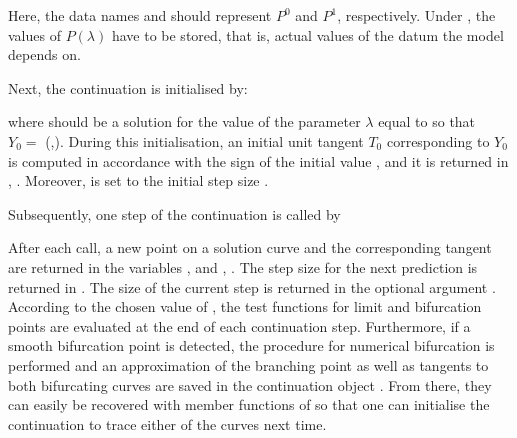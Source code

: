 \documentclass[a4paper,11pt,english]{sphinxmanual}
\begin{document}
Here, the data names  and  should represent
\(P^{0}\) and \(P^{1}\), respectively. Under , the
values of \(P(\lambda)\) have to be stored, that is, actual values of the
datum the model depends on.

Next, the continuation is initialised by:

\begin{sphinxVerbatim}[commandchars=\\\{\}]
    
\end{sphinxVerbatim}

where  should be a solution for the value of the parameter \(\lambda\)
equal to  so that \(Y_{0}=\) (,). During
this initialisation, an initial unit tangent \(T_{0}\) corresponding to
\(Y_{0}\) is computed in accordance with the sign of the initial value
, and it is returned in , . Moreover,  is
set to the initial step size .

Subsequently, one step of the continuation is called by

\begin{sphinxVerbatim}[commandchars=\\\{\}]
     
\end{sphinxVerbatim}

After each call, a new point on a solution curve and the corresponding tangent
are returned in the variables ,  and , . The
step size for the next prediction is returned in . The size of the
current step is returned in the optional argument . According to the
chosen value of , the test functions for limit and bifurcation
points are evaluated at the end of each continuation step. Furthermore, if a
smooth bifurcation point is detected, the procedure for numerical bifurcation
is performed and an approximation of the branching point as well as tangents to
both bifurcating curves are saved in the continuation object . From
there, they can easily be recovered with member functions of  so that one
can initialise the continuation to trace either of the curves next time.
\end{document}
